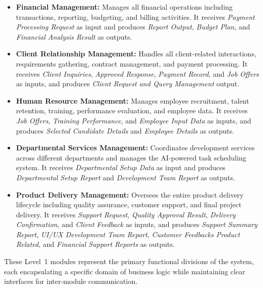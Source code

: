 \documentclass[12pt,a4paper]{article}
\begin{document}
\begin{itemize}
    \item \textbf{Financial Management:} Manages all financial operations including transactions, reporting, budgeting, and billing activities.  It receives \textit{Payment Processing Request} as input and produces \textit{Report Output}, \textit{Budget Plan}, and \textit{Financial Analysis Result} as outputs.
    
    \item \textbf{Client Relationship Management:} Handles all client‑related interactions, requirements gathering, contract management, and payment processing.  It receives \textit{Client Inquiries}, \textit{Approved Response}, \textit{Payment Record}, and \textit{Job Offers} as inputs, and produces \textit{Client Request and Query Management} output.
    
    \item \textbf{Human Resource Management:} Manages employee recruitment, talent retention, training, performance evaluation, and employee data.  It receives \textit{Job Offers}, \textit{Training Performance}, and \textit{Employee Input Data} as inputs, and produces \textit{Selected Candidate Details} and \textit{Employee Details} as outputs.
    
    \item \textbf{Departmental Services Management:} Coordinates development services across different departments and manages the AI‑powered task scheduling system.  It receives \textit{Departmental Setup Data} as input and produces \textit{Departmental Setup Report} and \textit{Development Team Report} as outputs.
    
    \item \textbf{Product Delivery Management:} Oversees the entire product delivery lifecycle including quality assurance, customer support, and final project delivery.  It receives \textit{Support Request}, \textit{Quality Approval Result}, \textit{Delivery Confirmation}, and \textit{Client Feedback} as inputs, and produces \textit{Support Summary Report}, \textit{UI/UX Development Team Report}, \textit{Customer Feedbacks Product Related}, and \textit{Financial Support Reports} as outputs.
\end{itemize}

These Level~1 modules represent the primary functional divisions of the system, each encapsulating a specific domain of business logic while maintaining clear interfaces for inter‑module communication.
\end{document}
